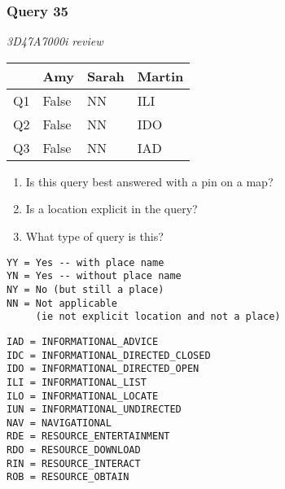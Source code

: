 \begin{frame}[fragile]
\frametitle{Query 35}
\vspace{1em}

\emph{3D47A7000i review}

\vfill

\begin{table}
  \centering
  \begin{tabular}{ l l l l }
    & \textbf{Amy} & \textbf{Sarah} & \textbf{Martin}\\
    \toprule
    Q1 & False & NN & ILI\\
Q2 & False & NN & IDO\\
Q3 & False & NN & IAD\\
    \bottomrule
  \end{tabular}
\end{table}

\vfill

\tiny{

\begin{enumerate}
\item Is this query best answered with a pin on a map?
\item Is a location explicit in the query?
\item What type of query is this?
\end{enumerate}

\vfill

\begin{multicols}{2}
\begin{verbatim}
YY = Yes -- with place name
YN = Yes -- without place name
NY = No (but still a place)
NN = Not applicable 
     (ie not explicit location and not a place)
\end{verbatim}

\columnbreak
\begin{verbatim}
IAD = INFORMATIONAL_ADVICE
IDC = INFORMATIONAL_DIRECTED_CLOSED
IDO = INFORMATIONAL_DIRECTED_OPEN
ILI = INFORMATIONAL_LIST
ILO = INFORMATIONAL_LOCATE
IUN = INFORMATIONAL_UNDIRECTED
NAV = NAVIGATIONAL
RDE = RESOURCE_ENTERTAINMENT
RDO = RESOURCE_DOWNLOAD
RIN = RESOURCE_INTERACT
ROB = RESOURCE_OBTAIN
\end{verbatim}
\end{multicols}
}

\end{frame}


